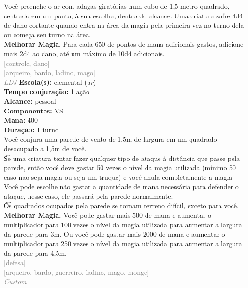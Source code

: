 \documentclass{RPG_Adventure}[2021/10/20]
\begin{document}
{\normalsize Você preenche o ar com adagas giratórias num cubo de 1,5 metro quadrado, centrado em um ponto, à sua escolha, dentro do alcance. Uma criatura sofre 4d4 de dano cortante quando entra na área da magia pela primeira vez no turno dela ou começa seu turno na área.\\\t \textbf{Melhorar Magia}. Para cada 650 de pontos de mana adicionais gastos, adicione mais 2d4 ao dano, até um máximo de 10d4 adicionais.\\}
{\scriptsize \textcolor{gray}{[controle, dano]\\}}
{\scriptsize \textcolor{gray}{[arqueiro, bardo, ladino, mago]\\}}
{\tiny \textcolor{gray}{\textit{LDJ}}}\jump{}
{\small \t \textbf{Escola(s):} elemental (\textit{ar})\\\t \textbf{Tempo conjuração:} 1 ação\\\t \textbf{Alcance:} pessoal\\\t \textbf{Componentes:} VS\\\t \textbf{Mana:} 400\\\t \textbf{Duração:} 1 turno\\}
{\normalsize Você conjura uma parede de vento de 1,5m de largura em um quadrado desocupado a 1,5m de você.\\\t Se uma criatura tentar fazer qualquer tipo de ataque à distância que passe pela parede, então você deve gastar 50 vezes o nível da magia utilizada (mínimo 50 caso não seja magia ou seja um truque) e você anula completamente a magia. Você pode escolhe não gastar a quantidade de mana necessária para defender o ataque, nesse caso, ele passará pela parede normalmente.\\\t Os quadrados ocupados pela parede se tornam terreno difícil, exceto para você.\\\t \textbf{Melhorar Magia.} Você pode gastar mais 500 de mana e aumentar o multiplicador para 100 vezes o nível da magia utilizada para aumentar a largura da parede para 3m. Ou você pode gastar mais 2000 de mana e aumentar o multiplicador para 250 vezes o nível da magia utilizada para aumentar a largura da parede para 4,5m.\\}
{\scriptsize \textcolor{gray}{[defesa]\\}}
{\scriptsize \textcolor{gray}{[arqueiro, bardo, guerreiro, ladino, mago, monge]\\}}
{\tiny \textcolor{gray}{\textit{Custom}}}\jump{}
\end{document}

